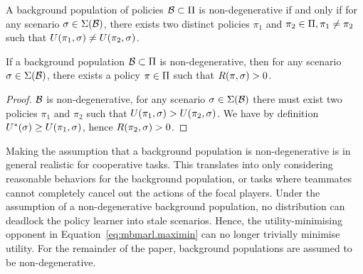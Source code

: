 \begin{definition}
        A background population of policies $\mathcal{B} \subset \Pi$ is non-degenerative if and only if for any scenario $\sigma\in \Sigma(\mathcal{B})$, there exists two distinct policies $\pi_1$ and  $\pi_2 \in \Pi, \pi_1 \neq \pi_2$ such that $U(\pi_1, \sigma) \neq U(\pi_2, \sigma)$.
    \end{definition}
\begin{lemma}
    If a background population $\mathcal{B}\subset\Pi$ is non-degenerative, then
    for any scenario $\sigma \in \Sigma(\mathcal{B})$, there exists a policy $\pi \in \Pi$ such that $R(\pi, \sigma) > 0$. 
    \begin{proof}
        $\mathcal{B}$ is non-degenerative, for any scenario $\sigma \in \Sigma(\mathcal{B})$ there must exist two policies $\pi_1$ and $\pi_2$ such that $U(\pi_1, \sigma) > U(\pi_2, \sigma)$. We have by definition $U^*(\sigma)\geq U(\pi_1, \sigma)$, hence $R(\pi_2, \sigma) > 0$.
    \end{proof}
\end{lemma}
Making the assumption that a background population is non-degenerative is in general realistic for cooperative tasks. This translates into only considering reasonable behaviors for the background population, or tasks where teammates cannot completely cancel out the actions of the focal players. Under the assumption of a non-degenerative background population, no distribution can deadlock the policy learner into stale scenarios. Hence, the utility-minimising opponent in Equation~\ref{eq:mbmarl.maximin} can no longer trivially minimise utility.
For the remainder of the paper, background populations are assumed to be non-degenerative. 





